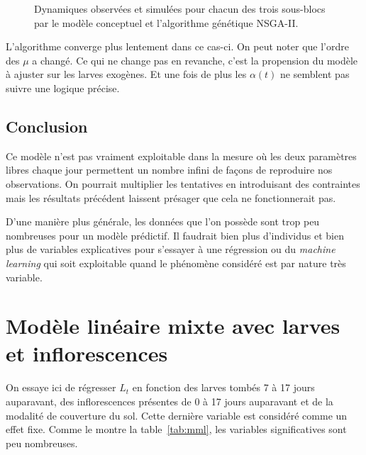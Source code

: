 \documentclass[a4paper, 11pt]{article}
\begin{document}
\begin{figure}[ht]
 \centering
 \caption{Dynamiques observées et simulées pour chacun des trois sous-blocs par le modèle conceptuel et l'algorithme génétique NSGA-II.}
 \label{fig:t}
\end{figure}

L'algorithme converge plus lentement dans ce cas-ci. On peut noter que l'ordre des $\mu$ a changé. Ce qui ne change pas en revanche, c'est la propension du modèle à ajuster sur les larves exogènes. Et une fois de plus les $\alpha(t)$ ne semblent pas suivre une logique précise.


\subsection{Conclusion}

Ce modèle n'est pas vraiment exploitable dans la mesure où les deux paramètres libres chaque jour permettent un nombre infini de façons de reproduire nos observations. On pourrait multiplier les tentatives en introduisant des contraintes mais les résultats précédent laissent présager que cela ne fonctionnerait pas.

D'une manière plus générale, les données que l'on possède sont trop peu nombreuses pour un modèle prédictif. Il faudrait bien plus d'individus et bien plus de variables explicatives pour s'essayer à une régression ou du \emph{machine learning} qui soit exploitable quand le phénomène considéré est par nature très variable.

\appendix
\newpage
\section{Modèle linéaire mixte avec larves et inflorescences}

On essaye ici de régresser $L_t$ en fonction des larves tombés 7 à 17 jours auparavant, des inflorescences présentes de 0 à 17 jours auparavant et de la modalité de couverture du sol. Cette dernière variable est considéré comme un effet fixe. Comme le montre la table~\ref{tab:mml}, les variables significatives sont peu nombreuses.
\end{document}
